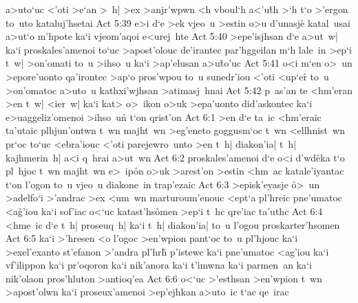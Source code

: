 a>uto`uc
<'oti
>e`an
>~h|
>ex
>anjr'wpwn
<h
vboul`h
a<'u\r{t}h
>`h
t`o
>'ergon
to~uto
kataluj'hsetai\bibvsend
\vs Act 5:39
e>i
d`e
>ek
vjeo~u
>estin
o>u
d'unasje\r{}
katal~usai
a>ut`o
m'hpote
ka`i
vjeom'aqoi
e<urej~hte\bibvsend
\vs Act 5:40
>epe'isjhsan
d`e
a>ut~w|
ka`i
proskales'amenoi
to`uc
>apost'olouc
de'irantec
par'hggeilan
m`h
lale~in
>ep`i
t~w|
>on'omati
to~u
>ihso~u
ka`i
>ap'elusan
a>u\r{t}o'uc\bibvsend
{}
\vs Act 5:41
o<i
m`en
o>~un
>epore'uonto
qa'irontec
>ap`o
pros'wpou
to~u
sunedr'iou
<'oti
<up`er\r{}
to~u
>on'omatoc
a>uto~u
kathxi'wjhsan
>atimasj~hnai\bibvsend
\vs Act 5:42
p~as'an
te
<hm'eran
>en
t~w|
<ier~w|
ka`i
kat>
o>~ikon
o>uk
>epa'uonto
did'askontec
ka`i
e>uaggeliz'omenoi
>ihso~un\r{}
t`on
qrist'on\bibvsend
\vs Act 6:1
>en
d`e
ta~ic
<hm'eraic
ta'utaic
plhjun'ontwn
t~wn
majht~wn
>eg'eneto
goggusm`oc
t~wn
<ellhnist~wn
pr`oc
to`uc
<ebra'iouc
<'oti
parejewro~unto
>en
t~h|
diakon'ia|
t~h|
kajhmerin~h|
a<i
q~hrai
a>ut~wn\bibvsend
\vs Act 6:2
proskales'amenoi
d`e
o<i
d'wd\r{e}ka
t`o
pl~hjoc
t~wn
majht~wn
e>~ip\r{o}n
o>uk
>arest'on
>estin
<hm~ac
katale'iyantac
t`on
l'ogon
to~u
vjeo~u
diakone~in
trap'ezaic\bibvsend
\vs Act 6:3
>e\-pi\-sk'e\-ya\-sje
\r{o}>~un
>adelfo`i
>'andrac
>ex
<um~wn
marturoum'enouc
<ept`a
pl'hreic
pne'umatoc
<a\r{g}'iou
ka`i
sof'iac
o<`uc
katast'hs\r{o}men
>ep`i
t~hc
qre'iac
ta'uthc\bibvsend
\vs Act 6:4
<hme~ic
d`e
t~h|
proseuq~h|
ka`i
t~h|
diakon'ia|
to~u
l'ogou
proskarter'hsomen\bibvsend
\vs Act 6:5
ka`i
>'hresen
<o
l'ogoc
>en'wpion
pant`oc
to~u
pl'hjouc
ka`i
>exel'exanto
st'efanon
>'andra
pl'hr\r{h}
p'istewc
ka`i
pne'umatoc
<ag'iou
ka`i
vf'ilippon
ka`i
pr'oqoron
ka`i
nik'anora
ka`i
t'imwna
ka`i
parmen~an
ka`i
nik'olaon
pros'hluton
>antioq'ea\bibvsend
\vs Act 6:6
o<`uc
>'esthsan
>en'wpion
t~wn
>apost'olwn
ka`i
proseux'amenoi
>ep'ejhkan
a>uto~ic
t`ac
qe~irac\bibvsend
